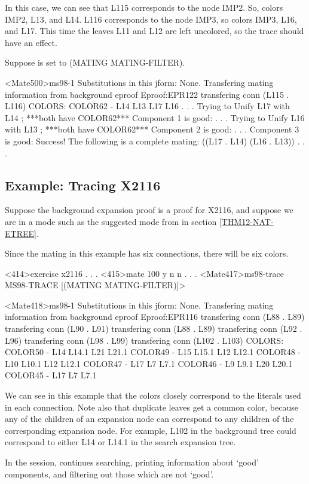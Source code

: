 In this case, we can see that L115 corresponds to the node IMP2.
So, {\TPS} colors IMP2, L13, and L14.  L116 corresponds to the node IMP3,
so {\TPS} colors IMP3, L16, and L17.
This time the leaves L11 and L12 are left uncolored,
so the trace should have an effect.

Suppose  is set to (MATING MATING-FILTER).

\begin{tpsexample}
<Mate500>ms98-1
Substitutions in this jform:
None.
Transfering mating information from background eproof
Eproof:EPR122
transfering conn (L115 . L116)
COLORS:
COLOR62 - L14 L13 L17 L16
. . .
Trying to Unify L17 with L14  ; ***both have COLOR62***
Component 1 is good:
. . .
Trying to Unify L16 with L13  ; ***both have COLOR62***
Component 2 is good:
. . .
Component 3 is good:
Success! The following is a complete mating:
((L17 . L14) (L16 . L13))
. . .
\end{tpsexample}

\subsection{Example: Tracing X2116}\label{X2116-MS98-TRACE}

Suppose the background expansion proof is a proof for X2116,
and suppose we are in a mode such as the suggested mode
from  in section \ref{THM12-NAT-ETREE}.

Since the mating in this example has six connections, there
will be six colors.

\begin{tpsexample}
<414>exercise x2116
. . .
<415>mate 100 y n n
. . .
<Mate417>ms98-trace
MS98-TRACE [(MATING MATING-FILTER)]>

<Mate418>ms98-1
Substitutions in this jform:
None.
Transfering mating information from background eproof
Eproof:EPR116
transfering conn (L88 . L89)
transfering conn (L90 . L91)
transfering conn (L88 . L89)
transfering conn (L92 . L96)
transfering conn (L98 . L99)
transfering conn (L102 . L103)
COLORS:
COLOR50 - L14 L14.1 L21 L21.1
COLOR49 - L15 L15.1 L12 L12.1
COLOR48 - L10 L10.1 L12 L12.1
COLOR47 - L17 L7 L7.1
COLOR46 - L9 L9.1 L20 L20.1
COLOR45 - L17 L7 L7.1
\end{tpsexample}

We can see in this example that the colors closely correspond
to the literals used in each connection.  Note also that
duplicate leaves get a common color, because any of the
children of an expansion node can correspond to any children
of the corresponding expansion node.  For example, L102
in the background tree could correspond to either
L14 or L14.1 in the search expansion tree.

In the session, {\TPS} continues searching, printing information about
`good' components, and filtering out those which are not `good'.
